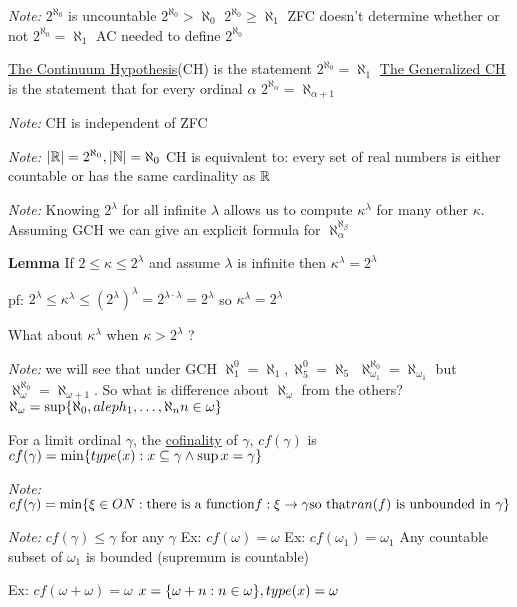 \emph{Note: } $2^{\aleph_0}$ is uncountable
$2^{\aleph_0} > \aleph_0$
$2^{\aleph_0} \geq \aleph_1$
ZFC doesn't determine whether or not $2^{\aleph_0} = \aleph_1$
AC needed to define $2^{\aleph_0}$

\dfn \underline{The Continuum Hypothesis}(CH) is the statement $2^{\aleph_0} = \aleph_1$
\underline{The Generalized CH} is the statement that for every ordinal $\alpha$ $2^{\aleph_\alpha} = \aleph_{\alpha+1}$

\emph{Note:} CH is independent of ZFC

\newcommand{\NN}{\mathbb N}
\newcommand{\ZZ}{\mathbb Z}
\newcommand{\QQ}{\mathbb Q}

\emph{Note: } $|\RR| = 2^{\aleph_0}, |\NN| = \aleph_0$
CH is equivalent to: every set of real numbers is either countable or has the same cardinality as $\mathbb R$

\emph{Note: } Knowing $2^\lambda$ for all infinite $\lambda$ allows us to compute $\kappa^\lambda$ for many other $\kappa$.
Assuming GCH we can give an explicit formula for $\aleph_\alpha^{\aleph_\beta}$

\textbf{Lemma} If $2 \leq \kappa \leq 2^\lambda$ and assume $\lambda$ is infinite
then $\kappa^\lambda = 2^\lambda$

pf: $2^\lambda \leq \kappa^\lambda \leq (2^\lambda)^\lambda = 2^{\lambda \cdot \lambda} = 2^\lambda$ so $\kappa^\lambda = 2^\lambda$

What about $\kappa^\lambda$ when $\kappa > 2^\lambda$ ?

\emph{Note: } we will see that under GCH $\aleph_1^0 = \aleph_1, \aleph_5^0 = \aleph_5$
$\aleph_{\omega_1}^{\aleph_0} = \aleph_{\omega_1}$
but $\aleph_\omega^{\aleph_0} = \aleph_{\omega + 1}$.
So what is difference about $\aleph_\omega$ from the others?
$\aleph_\omega = \sup\{\aleph_0, aleph_1, \dots , \aleph_n n \in \omega\}$

\dfn For a limit ordinal $\gamma$, the \underline{cofinality} of $\gamma$, $cf(\gamma)$ is
$cf(\gamma) = \min\{type(x) : x \subseteq \gamma \wedge \sup x = \gamma\}$

\emph{Note: } $cf(\gamma) =\min\{\xi \in ON : \text{there is a function} f : \xi \rightarrow \gamma \text{so that} ran(f) \text{ is unbounded in } \gamma\}$

\emph{Note: } $cf(\gamma) \leq \gamma$ for any $\gamma$
Ex: $cf(\omega) = \omega$
Ex: $cf(\omega_1) = \omega_1$
Any countable subset of $\omega_1$ is bounded (supremum is countable)

Ex: $cf(\omega + \omega) = \omega$
$x = \{\omega + n : n \in \omega\}, type(x) = \omega$

